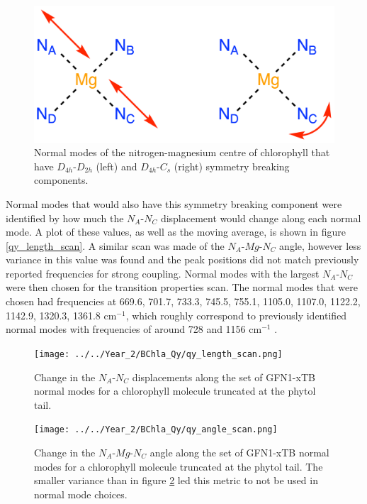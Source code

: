 \begin{figure}
    \centering
    \includegraphics[scale=1.5]{chapters/4_chl_xtb/D4h_symmetry.png}
    \caption{Normal modes of the nitrogen-magnesium centre of chlorophyll that have
    $D_{4h}$-$D_{2h}$ (left) and $D_{4h}$-$C_{s}$ (right) symmetry breaking components.}
    \label{fig:D4_sym_breaking}
\end{figure}

Normal modes that would also have this symmetry breaking component were identified
by how much the $N_A$-$N_C$ displacement would change along each normal mode. A plot of these
values, as well as the moving average, is shown in figure \ref{qy_length_scan}.
A similar scan was made of the $N_A$-$Mg$-$N_C$ angle, however less variance in
this value was found and the peak positions did not match previously reported frequencies
for strong coupling. Normal modes with the largest $N_A$-$N_C$ were then chosen 
for the transition properties scan. The normal modes that were chosen had frequencies 
at 669.6, 701.7, 733.3, 745.5, 755.1, 1105.0, 1107.0, 1122.2, 1142.9, 1320.3, 1361.8 
$\text{cm}^{-1}$, which roughly correspond to previously identified normal modes
with frequencies of around 728 and 1156 $\text{cm}^{-1}$ \cite{Kim2020}.

\begin{figure}
    \centering
    \texttt{[image: ../../Year\_2/BChla\_Qy/qy\_length\_scan.png]}
    \caption{Change in the $N_A$-$N_C$ displacements along the set of GFN1-xTB 
    normal modes for a chlorophyll molecule truncated at the phytol tail.}
    \label{fig:qy_length_scan}
\end{figure}

\begin{figure}
    \centering
    \texttt{[image: ../../Year\_2/BChla\_Qy/qy\_angle\_scan.png]}
    \caption{Change in the $N_A$-$Mg$-$N_C$ angle along the set of GFN1-xTB normal
    modes for a chlorophyll molecule truncated at the phytol tail. The smaller variance
    than in figure \ref{fig:qy_length_scan} led this metric to not be used in normal
    mode choices.}
    \label{fig:qy_angle_scan}
\end{figure}

